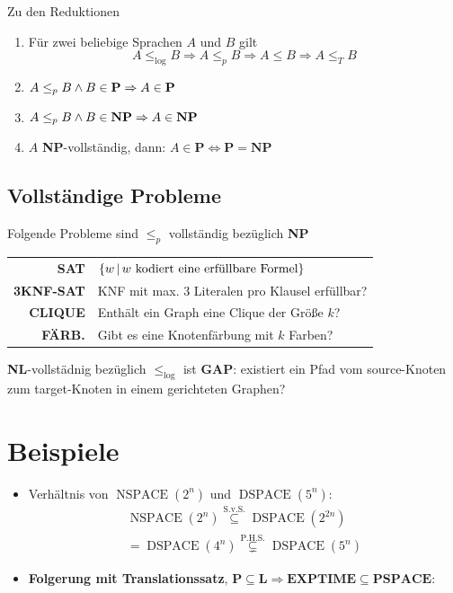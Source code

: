 \documentclass[landscape, 8pt, a4paper]{extarticle}
\newcommand{\poly}{\textbf{P}}
\newcommand{\npoly}{\textbf{NP}}
\newcommand{\set}[2]{\ensuremath\left\{ #1 \,\middle|\, #2 \right\}}
\begin{document}
\begin{multicols}{3}
	Zu den Reduktionen
	\begin{enumerate}
		\item	Für zwei beliebige Sprachen $A$ und $B$ gilt
		\begin{equation*}
			A\leq_{\log}B\Rightarrow A\leq_p B\Rightarrow A\leq B\Rightarrow A\leq_T B
		\end{equation*}
		\item $A\leq_p B\wedge B\in \text{\poly}\Rightarrow A\in\text{\poly}$
		\item $A\leq_p B\wedge B\in \text{\npoly}\Rightarrow A\in\text{\npoly}$
		\item $A$ \npoly-vollständig, dann: $A\in \poly \Leftrightarrow \poly=\npoly$
	\end{enumerate}

	\subsection{Vollständige Probleme}
	Folgende Probleme sind $\leq_p$ vollständig bezüglich \textbf{NP}
	\begin{tabular}{r|l}
		\textbf{SAT} & $\set{w}{w\text{ kodiert eine erfüllbare Formel}}$\\
		\textbf{3KNF-SAT} & KNF mit max. 3 Literalen pro Klausel erfüllbar?\\
		\textbf{CLIQUE} & Enthält ein Graph eine Clique der Größe $k$?\\
		\textbf{FÄRB.} & Gibt es eine Knotenfärbung mit $k$ Farben?\\
	\end{tabular}

	\textbf{NL}-vollstädnig bezüglich $\leq_{\log}$ ist \textbf{GAP}: existiert ein Pfad vom source-Knoten zum target-Knoten in einem gerichteten Graphen?


	\section{Beispiele}
	\begin{itemize}
		\item Verhältnis von $\operatorname{NSPACE}(2^n)$ und $\operatorname{DSPACE}(5^n)$:
		\begin{align*}
			\operatorname{NSPACE}(2^n)\overset{\text{S.v.S.}}\subseteq\operatorname{DSPACE}(2^{2n})\\
			=\operatorname{DSPACE}(4^n)\overset{\text{P.H.S.}}\subsetneq\operatorname{DSPACE}(5^n)
		\end{align*}
		\item \textbf{Folgerung mit Translationssatz}, $\poly\subseteq\textbf{L}\Rightarrow \textbf{EXPTIME}\subseteq\textbf{PSPACE}$:


\end{itemize}
\end{multicols}
\end{document}
